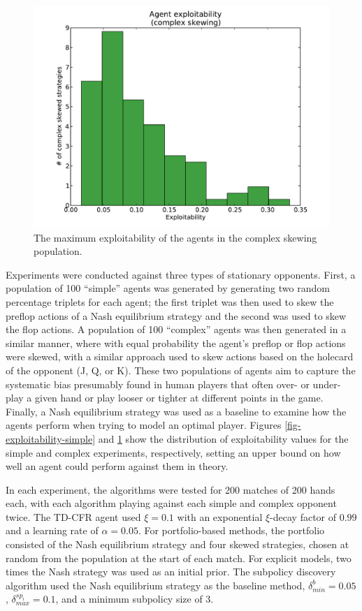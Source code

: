 \documentclass{aamas2013}
\begin{document}
    \begin{figure}[thb]
      \centering
        \includegraphics[scale=.45]{exploitability_complex.pdf}
      \caption{The maximum exploitability of the agents in the complex skewing population.}
      \label{fig-exploitability-complex}
    \end{figure}

    Experiments were conducted against three types of stationary opponents. First, a population of 100 ``simple'' agents was generated by generating two random percentage triplets for each agent; the first triplet was then used to skew the preflop actions of a Nash equilibrium strategy and the second was used to skew the flop actions. A population of 100 ``complex'' agents was then generated in a similar manner, where with equal probability the agent's preflop or flop actions were skewed, with a similar approach used to skew actions based on the holecard of the opponent (J, Q, or K). These two populations of agents aim to capture the systematic bias presumably found in human players that often over- or under- play a given hand or play looser or tighter at different points in the game. Finally, a Nash equilibrium strategy was used as a baseline to examine how the agents perform when trying to model an optimal player. Figures \ref{fig-exploitability-simple} and \ref{fig-exploitability-complex} show the distribution of exploitability values for the simple and complex experiments, respectively, setting an upper bound on how well an agent could perform against them in theory.

    In each experiment, the algorithms were tested for 200 matches of 200 hands each, with each algorithm playing against each simple and complex opponent twice. The TD-CFR agent used $\xi=0.1$ with an exponential $\xi$-decay factor of $0.99$ and a learning rate of $\alpha=0.05$. For portfolio-based methods, the portfolio consisted of the Nash equilibrium strategy and four skewed strategies, chosen at random from the population at the start of each match. For explicit models, two times the Nash strategy was used as an initial prior. The subpolicy discovery algorithm used the Nash equilibrium strategy as the baseline method, $\delta_{min}^{b}=0.05$, $\delta_{max}^{sp_i}=0.1$, and a minimum subpolicy size of 3.
\end{document}
